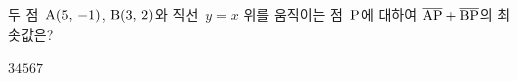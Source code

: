 두 점~$\mathrm{A}(5,\mkern3mu -1)$, $\mathrm{B}(3,\mkern3mu 2)$와 직선~$y=x$ 위를 움직이는 점~$\mathrm{P}$에 대하여 $\overline{\mathrm{AP}}+\overline{\mathrm{BP}}$의 최솟값은?
\begin{choices32}{$3$}{$4$}{$5$}{$6$}{$7$}\end{choices32}
